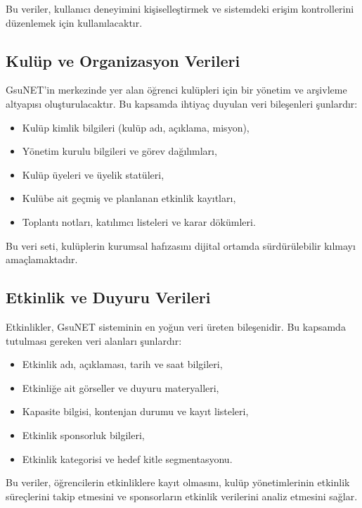 \documentclass[a4paper,12pt]{report}
\begin{document}
Bu veriler, kullanıcı deneyimini kişiselleştirmek ve sistemdeki erişim kontrollerini düzenlemek için kullanılacaktır.

\subsection{Kulüp ve Organizasyon Verileri}

GsuNET’in merkezinde yer alan öğrenci kulüpleri için bir yönetim ve arşivleme altyapısı oluşturulacaktır. Bu kapsamda ihtiyaç duyulan veri bileşenleri şunlardır:

\begin{itemize}
    \item Kulüp kimlik bilgileri (kulüp adı, açıklama, misyon),
    \item Yönetim kurulu bilgileri ve görev dağılımları,
    \item Kulüp üyeleri ve üyelik statüleri,
    \item Kulübe ait geçmiş ve planlanan etkinlik kayıtları,
    \item Toplantı notları, katılımcı listeleri ve karar dökümleri.
\end{itemize}

Bu veri seti, kulüplerin kurumsal hafızasını dijital ortamda sürdürülebilir kılmayı amaçlamaktadır.

\subsection{Etkinlik ve Duyuru Verileri}

Etkinlikler, GsuNET sisteminin en yoğun veri üreten bileşenidir. Bu kapsamda tutulması gereken veri alanları şunlardır:

\begin{itemize}
    \item Etkinlik adı, açıklaması, tarih ve saat bilgileri,
    \item Etkinliğe ait görseller ve duyuru materyalleri,
    \item Kapasite bilgisi, kontenjan durumu ve kayıt listeleri,
    \item Etkinlik sponsorluk bilgileri,
    \item Etkinlik kategorisi ve hedef kitle segmentasyonu.
\end{itemize}

Bu veriler, öğrencilerin etkinliklere kayıt olmasını, kulüp yönetimlerinin etkinlik süreçlerini takip etmesini ve sponsorların etkinlik verilerini analiz etmesini sağlar.
\end{document}
